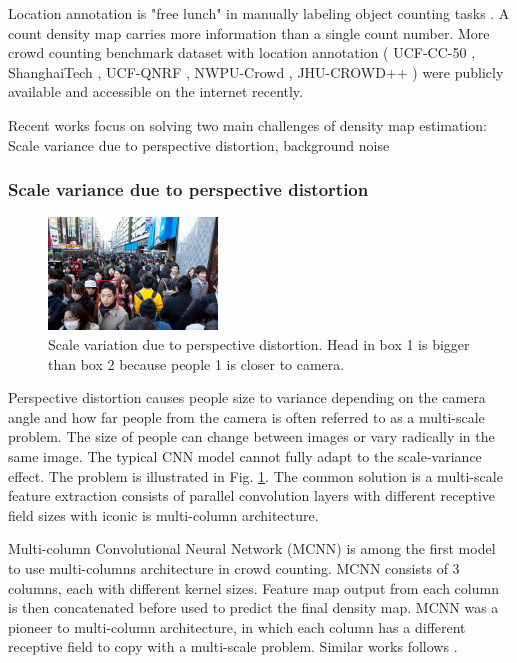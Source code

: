Location annotation is "free lunch" in manually labeling object counting tasks .
A count density map carries more information than a single count number.
More crowd counting benchmark dataset with location annotation ( UCF-CC-50 \cite{idrees2013multi}, ShanghaiTech \cite{zhang2016single}, UCF-QNRF \cite{idrees2018composition}, NWPU-Crowd \cite{gao2020nwpu}, JHU-CROWD++ \cite{sindagi2020jhucrowd}) 
were publicly available and accessible on the internet recently.

Recent works focus on solving two main challenges of density map estimation: Scale variance due to perspective distortion, background noise

\subsubsection{Scale variance due to perspective distortion} \hfill

\begin{figure}[htbp]
\centerline{\includegraphics[width=0.4\textwidth]{Picture/problem/part_a_train_IMG_44-annotate-scale.jpg}}
\caption{Scale variation due to perspective distortion. Head in box 1 is bigger than box 2 because people 1 is closer to camera.}
\label{fig:scale}
\end{figure}

Perspective distortion causes people size to variance depending on the camera angle and how far people from the camera is often referred to as a multi-scale problem. The size of people can change between images or vary radically in the same image. The typical CNN model cannot fully adapt to the scale-variance effect. The problem is illustrated in Fig. \ref{fig:scale}. The common solution is a multi-scale feature extraction consists of parallel convolution layers with different receptive field sizes with iconic is multi-column architecture.

Multi-column Convolutional Neural Network (MCNN) \cite{zhang2016single} is among the first model to use multi-columns architecture in crowd counting. MCNN consists of 3 columns, each with different kernel sizes. Feature map output from each column is then concatenated before used to predict the final density map. MCNN was a pioneer to multi-column architecture, in which each column has a different receptive field to copy with a multi-scale problem. Similar works follows \cite{zhang2019crowd, 9053780}. 

